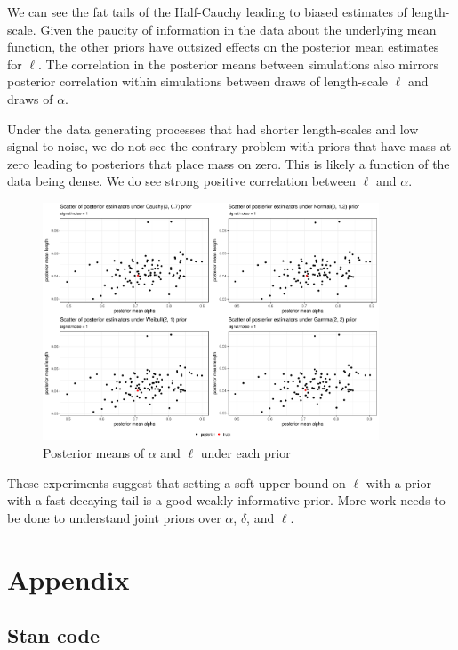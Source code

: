 \documentclass{article}
\begin{document}
We can see the fat tails of the Half-Cauchy leading to biased estimates of
length-scale. Given the paucity of information in the data about the 
underlying mean function, the other priors have outsized effects on 
the posterior mean estimates for $\ell$. The correlation in the posterior
means between simulations also mirrors posterior correlation within 
simulations between draws of length-scale $\ell$ and draws of $\alpha$.

Under the data generating processes that had shorter length-scales and low 
signal-to-noise, we do not see the contrary problem with priors that have mass
at zero leading to posteriors that place mass on zero. This is likely a
function of the data being dense. We do see strong positive correlation between
$\ell$ and $\alpha$. 

\begin{figure}[h] \label{joint_len_alpha_high_SN}
  \centering
  \includegraphics[width=100mm]{plots/dsets_0_05_alpha_0_7_alpha_length.pdf}
  \caption{Posterior means of $\alpha$ and $\ell$ under each prior}
\end{figure}

These experiments suggest that setting a soft upper bound on $\ell$ with a 
prior with a fast-decaying tail is a good weakly informative prior. More work needs 
to be done to understand joint priors over $\alpha$, $\delta$, and $\ell$.

\pagebreak

\section{Appendix}

\subsection{Stan code}
\end{document}
